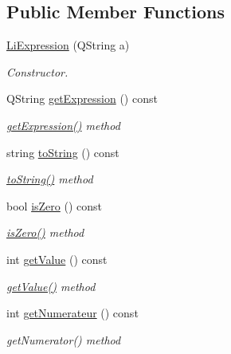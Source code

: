 \subsection*{Public Member Functions}
\begin{DoxyCompactItemize}
\item 
\hyperlink{class_li_expression_a33617047988cf710ee800aa463485e27}{Li\+Expression} (Q\+String a)
\begin{DoxyCompactList}\small\item\em Constructor. \end{DoxyCompactList}\item 
Q\+String \hyperlink{class_li_expression_a0bd7e53567dc458d662a225fbd0d3085}{get\+Expression} () const 
\begin{DoxyCompactList}\small\item\em \hyperlink{class_li_expression_a0bd7e53567dc458d662a225fbd0d3085}{get\+Expression()} method \end{DoxyCompactList}\item 
string \hyperlink{class_li_expression_afbf36946d48981027d8af7685c950a9b}{to\+String} () const 
\begin{DoxyCompactList}\small\item\em \hyperlink{class_li_expression_afbf36946d48981027d8af7685c950a9b}{to\+String()} method \end{DoxyCompactList}\item 
bool \hyperlink{class_li_expression_ac6e982f0986c28b01a1221830bce20eb}{is\+Zero} () const 
\begin{DoxyCompactList}\small\item\em \hyperlink{class_li_expression_ac6e982f0986c28b01a1221830bce20eb}{is\+Zero()} method \end{DoxyCompactList}\item 
int \hyperlink{class_li_expression_a17e0a77c27727e85d3784527c217827e}{get\+Value} () const 
\begin{DoxyCompactList}\small\item\em \hyperlink{class_li_expression_a17e0a77c27727e85d3784527c217827e}{get\+Value()} method \end{DoxyCompactList}\item 
int \hyperlink{class_li_expression_a5a4547ae8674412134264a8cd436e938}{get\+Numerateur} () const 
\begin{DoxyCompactList}\small\item\em get\+Numerator() method \end{DoxyCompactList}\item 

\end{DoxyCompactItemize}
